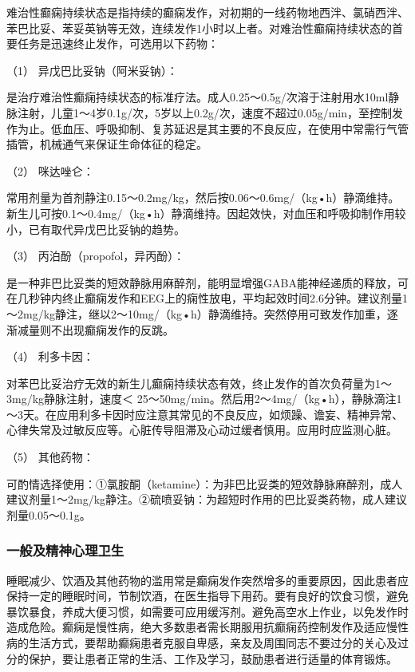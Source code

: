 难治性癫痫持续状态是指持续的癫痫发作，对初期的一线药物地西泮、氯硝西泮、苯巴比妥、苯妥英钠等无效，连续发作1小时以上者。对难治性癫痫持续状态的首要任务是迅速终止发作，可选用以下药物：

\hypertarget{text00245.htmlux5cux23CHP8-2-3-4-3-1}{}
（1） 异戊巴比妥钠（阿米妥钠）：

是治疗难治性癫痫持续状态的标准疗法。成人0.25～0.5g/次溶于注射用水10ml静脉注射，儿童1～4岁0.1g/次，5岁以上0.2g/次，速度不超过0.05g/min，至控制发作为止。低血压、呼吸抑制、复苏延迟是其主要的不良反应，在使用中常需行气管插管，机械通气来保证生命体征的稳定。

\hypertarget{text00245.htmlux5cux23CHP8-2-3-4-3-2}{}
（2） 咪达唑仑：

常用剂量为首剂静注0.15～0.2mg/kg，然后按0.06～0.6mg/（kg•h）静滴维持。新生儿可按0.1～0.4mg/（kg•h）静滴维持。因起效快，对血压和呼吸抑制作用较小，已有取代异戊巴比妥钠的趋势。

\hypertarget{text00245.htmlux5cux23CHP8-2-3-4-3-3}{}
（3） 丙泊酚（propofol，异丙酚）：

是一种非巴比妥类的短效静脉用麻醉剂，能明显增强GABA能神经递质的释放，可在几秒钟内终止癫痫发作和EEG上的痫性放电，平均起效时间2.6分钟。建议剂量1～2mg/kg静注，继以2～10mg/（kg•h）静滴维持。突然停用可致发作加重，逐渐减量则不出现癫痫发作的反跳。

\hypertarget{text00245.htmlux5cux23CHP8-2-3-4-3-4}{}
（4） 利多卡因：

对苯巴比妥治疗无效的新生儿癫痫持续状态有效，终止发作的首次负荷量为1～3mg/kg静脉注射，速度＜
25～50mg/min。然后用2～4mg/（kg•h），静脉滴注1～3天。在应用利多卡因时应注意其常见的不良反应，如烦躁、谵妄、精神异常、心律失常及过敏反应等。心脏传导阻滞及心动过缓者慎用。应用时应监测心脏。

\hypertarget{text00245.htmlux5cux23CHP8-2-3-4-3-5}{}
（5） 其他药物：

可酌情选择使用：①氯胺酮（ketamine）：为非巴比妥类的短效静脉麻醉剂，成人建议剂量1～2mg/kg静注。②硫喷妥钠：为超短时作用的巴比妥类药物，成人建议剂量0.05～0.1g。

\subsubsection{一般及精神心理卫生}

睡眠减少、饮酒及其他药物的滥用常是癫痫发作突然增多的重要原因，因此患者应保持一定的睡眠时间，节制饮酒，在医生指导下用药。要有良好的饮食习惯，避免暴饮暴食，养成大便习惯，如需要可应用缓泻剂。避免高空水上作业，以免发作时造成危险。癫痫是慢性病，绝大多数患者需长期服用抗癫痫药控制发作及适应慢性病的生活方式，要帮助癫痫患者克服自卑感，亲友及周围同志不要过分的关心及过分的保护，要让患者正常的生活、工作及学习，鼓励患者进行适量的体育锻炼。

